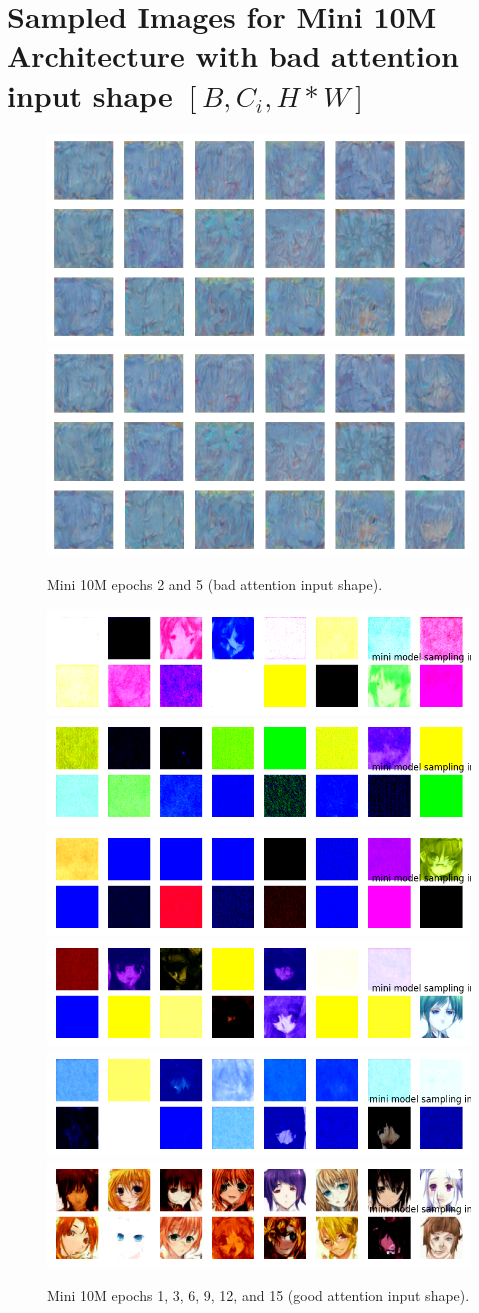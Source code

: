 \documentclass[twocolumn,superscriptaddress,aps]{revtex4-1}
\begin{document}
\section{Sampled Images for Mini 10M Architecture with bad attention input shape $[B, C_i, H*W]$}
\begin{figure}[H]
    \centering
    \includegraphics[width=.45\textwidth]{figures/10M_epoch 2.png}
    \includegraphics[width=.45\textwidth]{figures/10M_epoch5_slightely diff_cains_bad_attention_.png}
    \caption{Mini 10M epochs 2 and 5 (bad attention input shape).}
    \label{fig:mini_10m_bad_attention_samples}
\end{figure}
\begin{figure}[H]
    \centering
    \includegraphics[width=.32\textwidth]{figures/mini_unet_ddpm_10M_ckpt_epoch_1_epoch_1_samples.png}
    \includegraphics[width=.32\textwidth]{figures/mini_unet_ddpm_10M_ckpt_epoch_3_epoch_3_samples.png}
    \includegraphics[width=.32\textwidth]{figures/mini_unet_ddpm_10M_ckpt_epoch_6_epoch_6_samples.png}
    \includegraphics[width=.32\textwidth]{figures/mini_unet_ddpm_10M_ckpt_epoch_9_epoch_9_samples.png}
    \includegraphics[width=.32\textwidth]{figures/mini_unet_ddpm_10M_ckpt_epoch_12_epoch_12_samples.png}
    \includegraphics[width=.32\textwidth]{figures/mini_unet_ddpm_10M_ckpt_epoch_15_epoch_15_samples.png}
    \caption{Mini 10M epochs 1, 3, 6, 9, 12, and 15 (good attention input shape).}
    \label{fig:mini_10m_good_attention_samples}
\end{figure}
\end{document}
